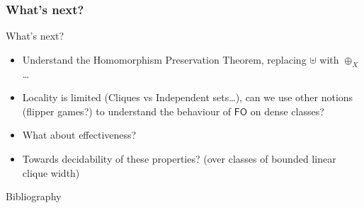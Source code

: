 \documentclass{beamer}
\newcommand{\tightlist}{}
\begin{document}
\subsubsection{What's next?}\label{whats-next}

\begin{frame}{What's next?}
\begin{itemize}
\tightlist
\item
  Understand the Homomorphism Preservation Theorem, replacing \(\uplus\)
  with \(\oplus_X\)\ldots{}
\item
  Locality is limited (Cliques vs Independent sets\ldots), can we use
  other notions (flipper games?) to understand the behaviour of
  \(\mathsf{FO}\) on dense classes?
\item
  What about effectiveness?
\item
  Towards decidability of these properties? (over classes of bounded
  linear clique width)
\end{itemize}
\end{frame}

\begin{frame}[allowframebreaks]{Bibliography}
    \printbibliography[heading=none]
\end{frame}

\appendix
\end{document}

